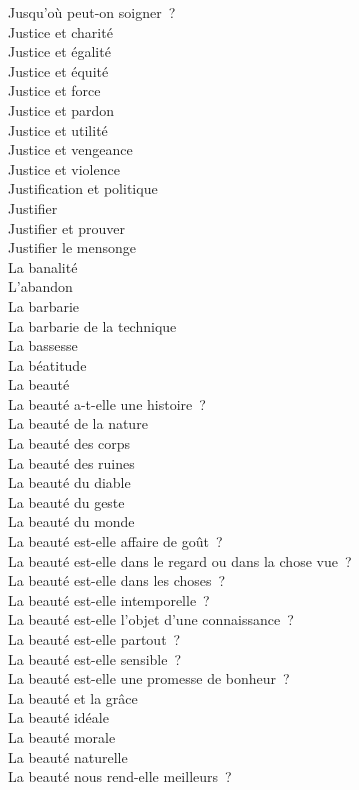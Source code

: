\documentclass[a4paper,12pt]{article}
\begin{document}
Jusqu'où peut-on soigner ? \\
Justice et charité \\
Justice et égalité \\
Justice et équité \\
Justice et force \\
Justice et pardon \\
Justice et utilité \\
Justice et vengeance \\
Justice et violence \\
Justification et politique \\
Justifier \\
Justifier et prouver \\
Justifier le mensonge \\
La banalité \\
L'abandon \\
La barbarie \\
La barbarie de la technique \\
La bassesse \\
La béatitude \\
La beauté \\
La beauté a-t-elle une histoire ? \\
La beauté de la nature \\
La beauté des corps \\
La beauté des ruines \\
La beauté du diable \\
La beauté du geste \\
La beauté du monde \\
La beauté est-elle affaire de goût ? \\
La beauté est-elle dans le regard ou dans la chose vue ? \\
La beauté est-elle dans les choses ? \\
La beauté est-elle intemporelle ? \\
La beauté est-elle l'objet d'une connaissance ? \\
La beauté est-elle partout ? \\
La beauté est-elle sensible ? \\
La beauté est-elle une promesse de bonheur ? \\
La beauté et la grâce \\
La beauté idéale \\
La beauté morale \\
La beauté naturelle \\
La beauté nous rend-elle meilleurs ? \\
\end{document}
